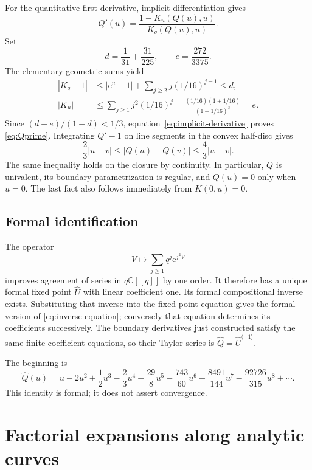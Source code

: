 \documentclass[11pt,a4paper]{article}
\numberwithin{equation}{section}
\theoremstyle{definition}
\theoremstyle{remark}
\newcommand{\C}{\mathbb C}
\newcommand{\ee}{\mathrm e}
\newcommand{\U}{\widehat U}
\newcommand{\Q}{\widehat Q}
\newcommand{\inv}{\langle-1\rangle}
\begin{document}
For the quantitative first derivative, implicit differentiation gives
\begin{equation}
 Q'(u)=\frac{1-K_u(Q(u),u)}{K_q(Q(u),u)}.
 \label{eq:implicit-derivative}
\end{equation}
Set
\[
 d=\frac1{31}+\frac{31}{225},\qquad e=\frac{272}{3375}.
\]
The elementary geometric sums yield
\begin{align*}
 |K_q-1|&\le |\ee^u-1|+\sum_{j\ge2}j(1/16)^{j-1}\le d,\\
 |K_u|&\le\sum_{j\ge1}j^2(1/16)^j
     =\frac{(1/16)(1+1/16)}{(1-1/16)^3}=e.
\end{align*}
Since $(d+e)/(1-d)<1/3$, equation~\eqref{eq:implicit-derivative}
proves \eqref{eq:Qprime}.  Integrating $Q'-1$ on line segments in the
convex half-disc gives
\begin{equation}
 \frac23|u-v|\le |Q(u)-Q(v)|\le\frac43|u-v|.
 \label{eq:bilipschitz}
\end{equation}
The same inequality holds on the closure by continuity.  In particular,
$Q$ is univalent, its boundary parametrization is regular, and $Q(u)=0$
only when $u=0$.  The last fact also follows immediately from $K(0,u)=0$.

\subsection{Formal identification}
The operator
\[
 V\longmapsto\sum_{j\ge1}q^j\ee^{j^2V}
\]
improves agreement of series in $q\C[[q]]$ by one order.  It therefore has
a unique formal fixed point $\U$ with linear coefficient one.  Its formal
compositional inverse exists.  Substituting that inverse into the fixed
point equation gives the formal version of
\eqref{eq:inverse-equation}; conversely that equation determines its
coefficients successively.  The boundary derivatives just constructed
satisfy the same finite coefficient equations, so their Taylor series is
$\Q=\U^{\inv}$.

The beginning is
\begin{equation}
 \Q(u)=u-2u^2+\frac12u^3-\frac23u^4
       -\frac{29}{8}u^5-\frac{743}{60}u^6
       -\frac{8491}{144}u^7-\frac{92726}{315}u^8+\cdots.
 \label{eq:first-coefficients}
\end{equation}
This identity is formal; it does not assert convergence.

\section{Factorial expansions along analytic curves}
\label{sec:transfer}
\end{document}
